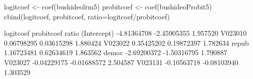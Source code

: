 \begin{Schunk}
\begin{Sinput}
 logitcoef <- coef(bushideolrm5)
 probitcoef <- coef(bushideoProbit5)
 cbind(logitcoef, probitcoef, ratio=logitcoef/probitcoef)
\end{Sinput}
\begin{Soutput}
              logitcoef  probitcoef    ratio
(Intercept) -4.81364708 -2.45905355 1.957520
V023010      0.06798295  0.03615298 1.880424
V023022      0.35425202  0.19872397 1.782634
repub        1.16723481  0.62634619 1.863562
democ       -2.69200372 -1.50316795 1.790887
V023027     -0.04229175 -0.01688572 2.504587
V023131     -0.10563718 -0.08103940 1.303529
\end{Soutput}
\end{Schunk}
